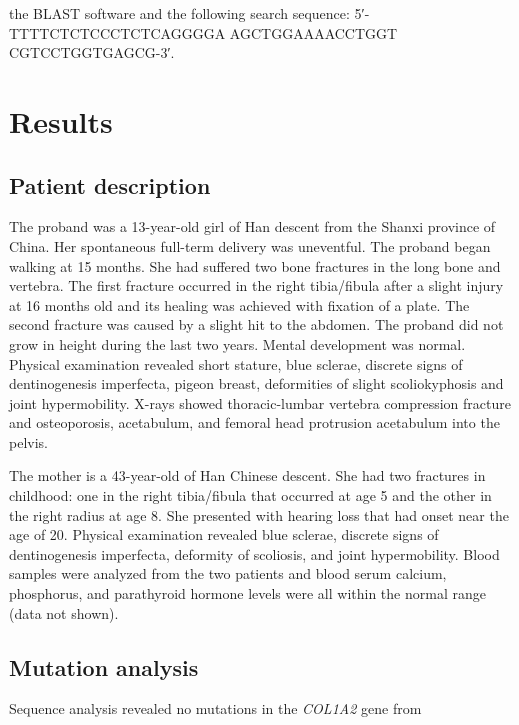                     the BLAST software and the following search sequence: 5′-TTTTCTCTCCCTCTCAGGGGA
                    AGCTGGAAAACCTGGT CGTCCTGGTGAGCG-3′.\section*{Results}\subsection*{Patient description}\par The proband was a 13-year-old girl of Han descent from the Shanxi province of
                    China. Her spontaneous full-term delivery was uneventful. The proband began
                    walking at 15 months. She had suffered two bone fractures in the long bone and
                    vertebra. The first fracture occurred in the right tibia/fibula after a slight
                    injury at 16 months old and its healing was achieved with fixation of a plate.
                    The second fracture was caused by a slight hit to the abdomen. The proband did
                    not grow in height during the last two years. Mental development was normal.
                    Physical examination revealed short stature, blue sclerae, discrete signs of
                    dentinogenesis imperfecta, pigeon breast, deformities of slight scoliokyphosis
                    and joint hypermobility. X-rays showed thoracic-lumbar vertebra compression
                    fracture and osteoporosis, acetabulum, and femoral head protrusion acetabulum
                    into the pelvis.\par The mother is a 43-year-old of Han Chinese descent. She had two fractures in
                    childhood: one in the right tibia/fibula that occurred at age 5 and the other in
                    the right radius at age 8. She presented with hearing loss that had onset near
                    the age of 20. Physical examination revealed blue sclerae, discrete signs of
                    dentinogenesis imperfecta, deformity of scoliosis, and joint hypermobility.
                    Blood samples were analyzed from the two patients and blood serum calcium,
                    phosphorus, and parathyroid hormone levels were all within the normal range
                    (data not shown).\subsection*{Mutation analysis}\par Sequence analysis revealed no mutations in the \textit{COL1A2} gene from
